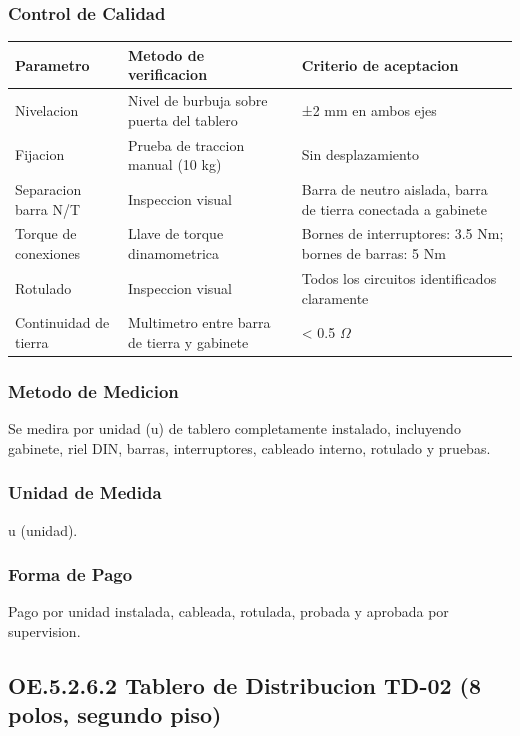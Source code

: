 \subsubsection{Control de Calidad}

\begin{longtable}{L{4.5cm} L{4.5cm} L{4.5cm}}
\toprule
\textbf{Parametro} & \textbf{Metodo de verificacion} & \textbf{Criterio de aceptacion} \\
\midrule
Nivelacion & Nivel de burbuja sobre puerta del tablero & ±2 mm en ambos ejes \\
Fijacion & Prueba de traccion manual (10 kg) & Sin desplazamiento \\
Separacion barra N/T & Inspeccion visual & Barra de neutro aislada, barra de tierra conectada a gabinete \\
Torque de conexiones & Llave de torque dinamometrica & Bornes de interruptores: 3.5 Nm; bornes de barras: 5 Nm \\
Rotulado & Inspeccion visual & Todos los circuitos identificados claramente \\
Continuidad de tierra & Multimetro entre barra de tierra y gabinete & < 0.5 $\Omega$ \\
\bottomrule
\end{longtable}

\subsubsection{Metodo de Medicion}

Se medira por unidad (u) de tablero completamente instalado, incluyendo gabinete, riel DIN, barras, interruptores, cableado interno, rotulado y pruebas.

\subsubsection{Unidad de Medida}

u (unidad).

\subsubsection{Forma de Pago}

Pago por unidad instalada, cableada, rotulada, probada y aprobada por supervision.

\subsection{OE.5.2.6.2 Tablero de Distribucion TD-02 (8 polos, segundo piso)}

